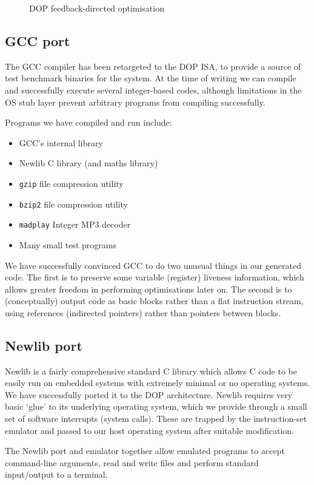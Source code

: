 \begin{figure}[tmb]
\centerline{}
\caption{\label{feedback}DOP feedback-directed optimisation}
\end{figure}

\subsection{GCC port}

The GCC compiler has been retargeted to the DOP ISA, to provide a source of test benchmark binaries for the system. At the time of writing we can compile and successfully execute several integer-based codes, although limitations in the OS stub layer prevent arbitrary programs from compiling successfully.

Programs we have compiled and run include:

\begin{itemize}
\item GCC's internal library
\item Newlib C library (and maths library)
\item \texttt{gzip} file compression utility
\item \texttt{bzip2} file compression utility
\item \texttt{madplay} Integer MP3 decoder
\item Many small test programs
\end{itemize}

We have successfully convinced GCC to do two unusual things in our generated code. The first is to preserve some variable (register) liveness information, which allows greater freedom in performing optimisations later on. The second is to (conceptually) output code as basic blocks rather than a flat instruction stream, using references (indirected pointers) rather than pointers between blocks.

\subsection{Newlib port}

Newlib is a fairly comprehensive standard C library which allows C code to be easily run on embedded systems with extremely minimal or no operating systems. We have successfully ported it to the DOP architecture. Newlib requires very basic `glue' to its underlying operating system, which we provide through a small set of software interrupts (system calls). These are trapped by the instruction-set emulator and passed to our host operating system after suitable modification.

The Newlib port and emulator together allow emulated programs to accept command-line arguments, read and write files and perform standard input/output to a terminal.
